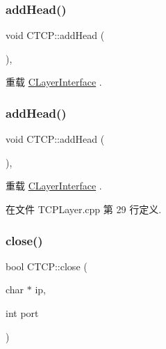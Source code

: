\subsubsection{\texorpdfstring{add\+Head()}{addHead()}\hspace{0.1cm}{\footnotesize\ttfamily [1/2]}}
{\footnotesize\ttfamily void C\+T\+C\+P\+::add\+Head (\begin{DoxyParamCaption}{ }\end{DoxyParamCaption})\hspace{0.3cm}{\ttfamily [protected]}, {\ttfamily [virtual]}}



重载 \hyperlink{class_c_layer_interface_ac38c51660960657ac42e37a19ea062b4}{C\+Layer\+Interface} .

\mbox{\label{class_c_t_c_p_a0c68800a3b6317cbe74aa2cb28ea3d9c}} 
\subsubsection{\texorpdfstring{add\+Head()}{addHead()}\hspace{0.1cm}{\footnotesize\ttfamily [2/2]}}
{\footnotesize\ttfamily void C\+T\+C\+P\+::add\+Head (\begin{DoxyParamCaption}{ }\end{DoxyParamCaption})\hspace{0.3cm}{\ttfamily [protected]}, {\ttfamily [virtual]}}



重载 \hyperlink{class_c_layer_interface_ac38c51660960657ac42e37a19ea062b4}{C\+Layer\+Interface} .



在文件 T\+C\+P\+Layer.\+cpp 第 29 行定义.

\mbox{\label{class_c_t_c_p_ab1b3f5ede8f15181ecd3355763e75892}} 
\subsubsection{\texorpdfstring{close()}{close()}}
{\footnotesize\ttfamily bool C\+T\+C\+P\+::close (\begin{DoxyParamCaption}\item[{char $\ast$}]{ip,  }\item[{int}]{port }\end{DoxyParamCaption})}

